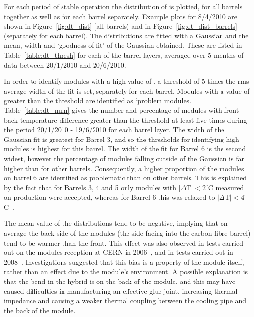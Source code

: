 For each period of stable operation the distribution of \deltat is plotted, for all barrels together as well as for each barrel separately. Example plots for 8/4/2010 are shown in Figure~\ref{fig:dt_dist} (all barrels) and  in Figure~\ref{fig:dt_dist_barrels} (separately for each barrel). The distributions are fitted with a Gaussian and the mean, width and `goodness of fit' of the Gaussian obtained. These are listed in Table~\ref{table:dt_thresh} for each of the barrel layers, averaged over 5 months of data between 20/1/2010 and 20/6/2010.  

In order to identify modules with a high value of \deltat, a threshold of 5 times the rms average width of the fit is set, separately for each barrel. Modules with a value of \deltat greater than the threshold are identified as `problem modules'. Table~\ref{table:dt_num} gives the number and percentage of modules with front-back temperature difference greater than the threshold at least five times during the period 20/1/2010 - 19/6/2010 for each barrel layer. The width of the Gaussian fit is greatest for Barrel 3, and so the thresholds for identifying high \deltat modules is highest for this barrel. The width of the fit for Barrel 6 is the second widest, however the percentage of modules falling outside of the Gaussian is far higher than for other barrels. Consequently, a higher proportion of the modules on barrel 6 are identified as problematic than on other barrels. This is explained by the fact that for Barrels 3, 4 and 5 only modules with $|\Delta \mathrm{T}| < 2^\circ$C measured on production were accepted, whereas for Barrel 6 this was relaxed to $|\Delta \mathrm{T}| < 4^\circ$C~\cite{Viehhauser:2006ix}. 

The mean value of the \deltat distributions tend to be negative, implying that on average the back side of the modules (the side facing into the carbon fibre barrel) tend to be warmer than the front. This effect was also observed in tests carried out on the modules reception at CERN in 2006~\cite{Viehhauser:2006ix}, and in tests carried out in 2008~\cite{Shaw:1229428}. Investigations suggested that this bias is a property of the module itself, rather than an effect due to the module's environment. A possible explanation is that the bend in the hybrid is on the back of the module, and this may have caused difficulties in manufacturing an  effective glue joint, increasing thermal impedance and causing a weaker thermal coupling between the cooling pipe and the back of the module.

